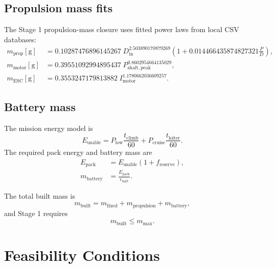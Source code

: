\documentclass[11pt]{article}
\begin{document}
\subsection{Propulsion mass fits}

The Stage 1 propulsion-mass closure uses fitted power laws from local CSV databases:
\begin{align}
m_{\mathrm{prop}}[\mathrm{g}] &=
0.10287476896145267 \;
D_{\mathrm{in}}^{2.503890170879269}
\left(1 + 0.014466435874827321 \frac{P}{D}\right), \\
m_{\mathrm{motor}}[\mathrm{g}] &=
0.39551092994895437 \;
P_{\mathrm{shaft,peak}}^{0.8602954664135029}, \\
m_{\mathrm{ESC}}[\mathrm{g}] &=
0.3553247179813882 \;
I_{\mathrm{motor}}^{1.1780662036609257}.
\end{align}

\subsection{Battery mass}

The mission energy model is
\begin{equation}
E_{\mathrm{usable}} =
P_{\mathrm{low}} \frac{t_{\mathrm{climb}}}{60}
+
P_{\mathrm{cruise}} \frac{t_{\mathrm{loiter}}}{60}.
\end{equation}
The required pack energy and battery mass are
\begin{align}
E_{\mathrm{pack}} &= E_{\mathrm{usable}}(1 + f_{\mathrm{reserve}}), \\
m_{\mathrm{battery}} &= \frac{E_{\mathrm{pack}}}{\epsilon_{\mathrm{batt}}}.
\end{align}

The total built mass is
\begin{equation}
m_{\mathrm{built}} = m_{\mathrm{fixed}} + m_{\mathrm{propulsion}} + m_{\mathrm{battery}},
\end{equation}
and Stage 1 requires
\begin{equation}
m_{\mathrm{built}} \le m_{\max}.
\end{equation}

\section{Feasibility Conditions}
\end{document}
